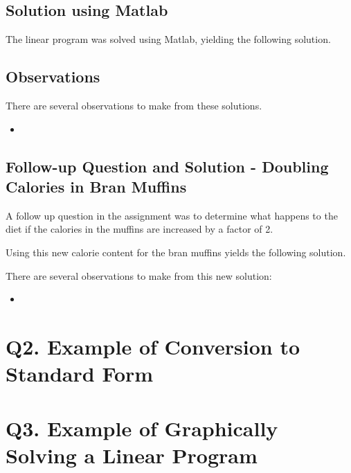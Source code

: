 \documentclass{article}
\begin{document}
    \subsection{Solution using Matlab}

    The linear program was solved using Matlab, yielding the following solution.


    \subsection{Observations}

    There are several observations to make from these solutions.

    \begin{itemize}
        \item 
    \end{itemize}

    \subsection{Follow-up Question and Solution - Doubling Calories in Bran Muffins}

    A follow up question in the assignment was to determine what happens to the diet if the calories in the muffins are increased by a factor of 2.

    Using this new calorie content for the bran muffins yields the following solution.


    There are several observations to make from this new solution:

    \begin{itemize}
        \item 
    \end{itemize}


    \section{Q2. Example of Conversion to Standard Form}

    \section{Q3. Example of Graphically Solving a Linear Program}
\end{document}

